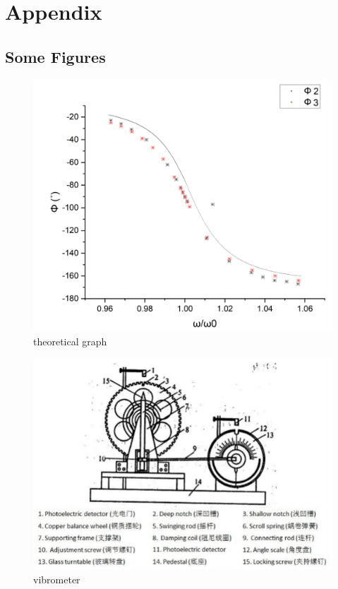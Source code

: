 \documentclass[12pt,a4paper]{article}
\begin{document}
\section*{Appendix \uppercase\expandafter{}}
\subsection*{Some Figures}
\begin{figure}[h]
    \centering
    \includegraphics[scale=0.4]{newnewthero.png}
    \caption{theoretical graph}
\end{figure}
\begin{figure}[h]
    \centering
    \includegraphics[scale=0.5]{vibrometer.png}
    \caption{vibrometer}
\end{figure}
\end{document}
